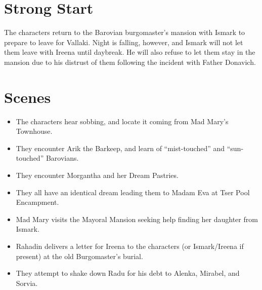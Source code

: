 \documentclass[a4paper,11pt]{article}
\begin{document}
\pagebreak
\section{Strong Start}
\label{sec:StrongStart}
The characters return to the Barovian burgomaster's mansion with Ismark to prepare to leave for Vallaki.
Night is falling, however, and Ismark will not let them leave with Ireena until daybreak. He will also refuse
to let them stay in the mansion due to his distrust of them following the incident with Father Donavich.

\section{Scenes}
\label{sec:Scenes}
\begin{itemize}
  \item The characters hear sobbing, and locate it coming from Mad Mary's Townhouse.
  \item They encounter Arik the Barkeep, and learn of ``mist-touched'' and ``sun-touched'' Barovians.
  \item They encounter Morgantha and her Dream Pastries.
  \item They all have an identical dream leading them to Madam Eva at Tser Pool Encampment.
  \item Mad Mary visits the Mayoral Mansion seeking help finding her daughter from Ismark.
  \item Rahadin delivers a letter for Ireena to the characters (or Ismark/Ireena if present) at the old 
  Burgomaster's burial.
  \item They attempt to shake down Radu for his debt to Alenka, Mirabel, and Sorvia.
\end{itemize}
\end{document}
